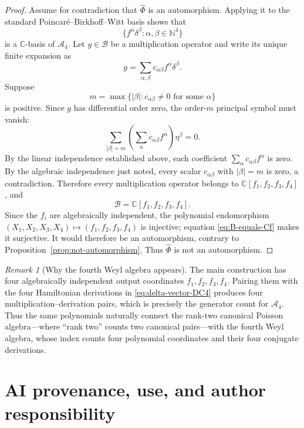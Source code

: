 \documentclass[11pt]{article}
\newcommand{\C}{\mathbb C}
\newcommand{\N}{\mathbb N}
\newcommand{\Bcal}{\mathcal B}
\newcommand{\Weyl}{\mathcal A}
\theoremstyle{remark}
\newtheorem{remark}[theorem]{Remark}
\begin{document}
\begin{proof}
Assume for contradiction that \(\widehat\Phi\) is an automorphism.  Applying
it to the standard Poincar\'e--Birkhoff--Witt basis shows that
\begin{equation}\label{eq:new-PBW}
  \{f^\alpha\delta^\beta:\alpha,\beta\in\N^4\}
\end{equation}
is a \(\C\)-basis of \(\Weyl_4\).  Let \(g\in\Bcal\) be a multiplication
operator and write its unique finite expansion as
\[
  g=\sum_{\alpha,\beta}c_{\alpha\beta}f^\alpha\delta^\beta.
\]
Suppose
\[
  m=\max\{|\beta|:c_{\alpha\beta}\neq0
       \text{ for some }\alpha\}
\]
is positive.  Since \(g\) has differential order zero, the order-\(m\)
principal symbol must vanish:
\begin{equation}\label{eq:top-symbol}
  \sum_{|\beta|=m}
    \left(\sum_\alpha c_{\alpha\beta}f^\alpha\right)\eta^\beta=0.
\end{equation}
By the linear independence established above, each coefficient
\(\sum_\alpha c_{\alpha\beta}f^\alpha\) is zero.  By the
algebraic independence just noted, every scalar \(c_{\alpha\beta}\) with
\(|\beta|=m\) is zero, a contradiction.
Therefore every multiplication operator belongs to
\(\C[f_1,f_2,f_3,f_4]\), and
\begin{equation}\label{eq:B-equals-Cf}
  \Bcal=\C[f_1,f_2,f_3,f_4].
\end{equation}
Since the \(f_i\) are algebraically independent, the polynomial endomorphism
\((X_1,X_2,X_3,X_4)\mapsto(f_1,f_2,f_3,f_4)\) is injective; equation
\eqref{eq:B-equals-Cf} makes it surjective.  It would therefore be an
automorphism, contrary to Proposition~\ref{prop:not-automorphism}.  Thus
\(\widehat\Phi\) is not an automorphism.
\end{proof}

\begin{remark}[Why the fourth Weyl algebra appears]
The main construction has four algebraically independent output coordinates
\(f_1,f_2,f_3,f_4\).  Pairing them with the four Hamiltonian derivations in
\eqref{eq:delta-vector-DC4} produces four multiplication--derivation pairs,
which is precisely the generator count for \(\Weyl_4\).  Thus the same
polynomials naturally connect the rank-two canonical Poisson algebra---where
``rank two'' counts two canonical pairs---with the fourth Weyl algebra, whose
index counts four polynomial coordinates and their four conjugate
derivations.
\end{remark}

\section*{AI provenance, use, and author responsibility}
\end{document}

